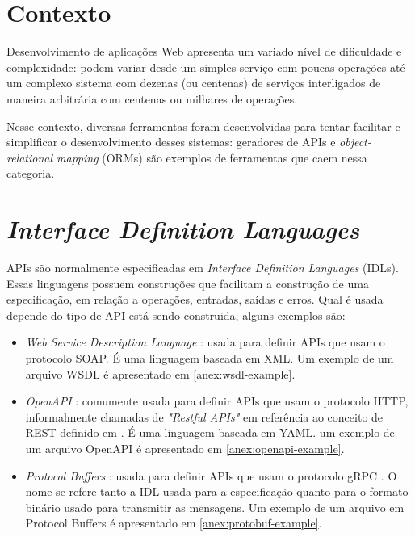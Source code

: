 \section{Contexto}

Desenvolvimento de aplicações Web apresenta um variado nível de dificuldade e
complexidade: podem variar desde um simples serviço com poucas operações até
um complexo sistema com dezenas (ou centenas) de serviços interligados de maneira
arbitrária com centenas ou milhares de operações.

Nesse contexto, diversas ferramentas foram desenvolvidas para tentar facilitar
e simplificar o desenvolvimento desses sistemas: geradores de APIs e \textit{object-relational
mapping} (ORMs) são exemplos de ferramentas que caem nessa categoria.

\section{\textit{Interface Definition Languages}}

APIs são normalmente especificadas em \textit{Interface Definition Languages}
(IDLs). Essas linguagens possuem construções que facilitam a construção de uma
especificação, em relação a operações, entradas, saídas e erros. Qual é usada
depende do tipo de API está sendo construida, alguns exemplos são:

\begin{itemize}
\item
  \textit{Web Service Description Language} \cite{wsdl:spec}: usada para
    definir APIs que usam o protocolo SOAP. É uma linguagem baseada em XML.
    Um exemplo de um arquivo WSDL é apresentado em \cref{anex:wsdl-example}.
\item
  \textit{OpenAPI} \cite{openapi:spec}: comumente usada para definir APIs que usam
    o protocolo HTTP, informalmente chamadas de \textit{"Restful APIs"} em referência
    ao conceito de REST definido em \cite{10.5555/932295}. É uma linguagem baseada
    em YAML. um exemplo de um arquivo OpenAPI é apresentado em \cref{anex:openapi-example}.
\item
  \textit{Protocol Buffers} \cite{googl:protobuf}: usada para definir APIs que usam
    o protocolo gRPC \cite{googl:grpc}. O nome se refere tanto a IDL usada para a
    especificação quanto para o formato binário usado para transmitir as mensagens.
    Um exemplo de um arquivo em Protocol Buffers é apresentado em \cref{anex:protobuf-example}.
\end{itemize}

